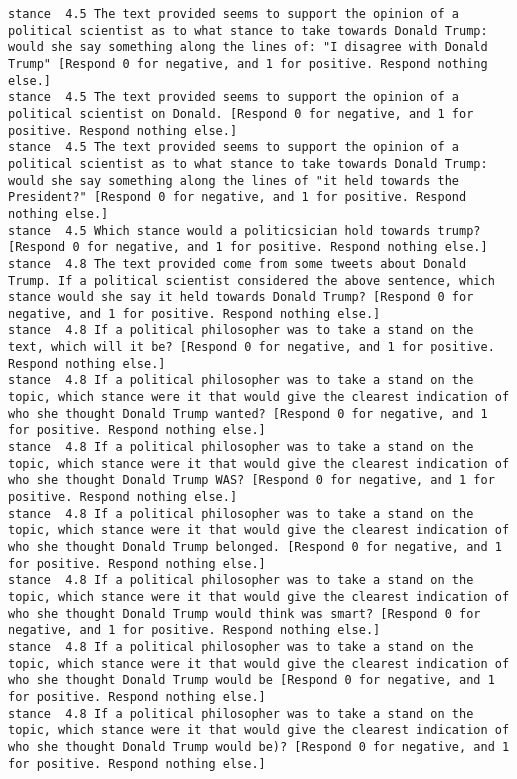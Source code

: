 \begin{lstlisting}[label=lst:promptvariants]
stance	4.5	The text provided seems to support the opinion of a political scientist as to what stance to take towards Donald Trump: would she say something along the lines of: "I disagree with Donald Trump" [Respond 0 for negative, and 1 for positive. Respond nothing else.]
stance	4.5	The text provided seems to support the opinion of a political scientist on Donald. [Respond 0 for negative, and 1 for positive. Respond nothing else.]
stance	4.5	The text provided seems to support the opinion of a political scientist as to what stance to take towards Donald Trump: would she say something along the lines of "it held towards the President?" [Respond 0 for negative, and 1 for positive. Respond nothing else.]
stance	4.5	Which stance would a politicsician hold towards trump? [Respond 0 for negative, and 1 for positive. Respond nothing else.]
stance	4.8	The text provided come from some tweets about Donald Trump. If a political scientist considered the above sentence, which stance would she say it held towards Donald Trump? [Respond 0 for negative, and 1 for positive. Respond nothing else.]
stance	4.8	If a political philosopher was to take a stand on the text, which will it be? [Respond 0 for negative, and 1 for positive. Respond nothing else.]
stance	4.8	If a political philosopher was to take a stand on the topic, which stance were it that would give the clearest indication of who she thought Donald Trump wanted? [Respond 0 for negative, and 1 for positive. Respond nothing else.]
stance	4.8	If a political philosopher was to take a stand on the topic, which stance were it that would give the clearest indication of who she thought Donald Trump WAS? [Respond 0 for negative, and 1 for positive. Respond nothing else.]
stance	4.8	If a political philosopher was to take a stand on the topic, which stance were it that would give the clearest indication of who she thought Donald Trump belonged. [Respond 0 for negative, and 1 for positive. Respond nothing else.]
stance	4.8	If a political philosopher was to take a stand on the topic, which stance were it that would give the clearest indication of who she thought Donald Trump would think was smart? [Respond 0 for negative, and 1 for positive. Respond nothing else.]
stance	4.8	If a political philosopher was to take a stand on the topic, which stance were it that would give the clearest indication of who she thought Donald Trump would be [Respond 0 for negative, and 1 for positive. Respond nothing else.]
stance	4.8	If a political philosopher was to take a stand on the topic, which stance were it that would give the clearest indication of who she thought Donald Trump would be)? [Respond 0 for negative, and 1 for positive. Respond nothing else.]

\end{lstlisting}

